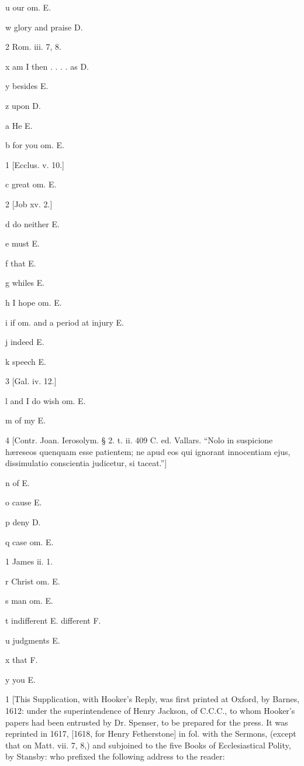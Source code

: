 u
our om. E.

w
glory and praise D.

2
Rom. iii. 7, 8.

x
am I then . . . . as D.

y
besides E.

z
upon D.

a
He E.

b
for you om. E.

1
[Ecclus. v. 10.]

c
great om. E.

2
[Job xv. 2.]

d
do neither E.

e
must E.

f
that E.

g
whiles E.

h
I hope om. E.

i
if om. and a period at injury E.

j
indeed E.

k
speech E.

3
[Gal. iv. 12.]

l
and I do wish om. E.

m
of my E.

4
[Contr. Joan. Ierosolym. § 2. t. ii. 409 C. ed. Vallars. “Nolo in suspicione hæreseos quenquam esse patientem; ne apud eos qui ignorant innocentiam ejus, dissimulatio conscientia judicetur, si taceat.”]

n
of E.

o
cause E.

p
deny D.

q
case om. E.

1
James ii. 1.

r
Christ om. E.

s
man om. E.

t
indifferent E. different F.

u
judgments E.

x
that F.

y
you E.

1
[This Supplication, with Hooker’s Reply, was first printed at Oxford, by Barnes, 1612: under the superintendence of Henry Jackson, of C.C.C., to whom Hooker’s papers had been entrusted by Dr. Spenser, to be prepared for the press. It was reprinted in 1617, [1618, for Henry Fetherstone] in fol. with the Sermons, (except that on Matt. vii. 7, 8,) and subjoined to the five Books of Ecclesiastical Polity, by Stansby: who prefixed the following address to the reader:

